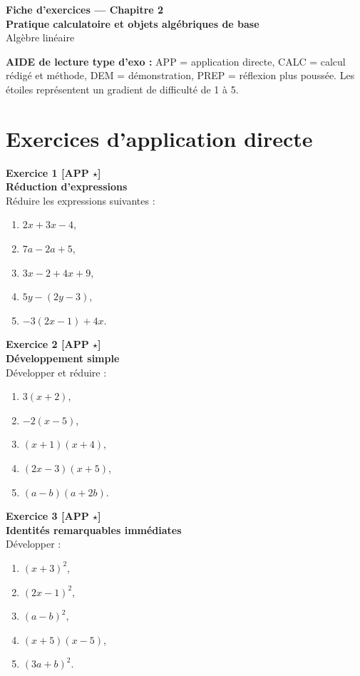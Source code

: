 \documentclass[11pt,a4paper]{article}
\begin{document}
\begin{center}
    {\LARGE \textbf{Fiche d’exercices --- Chapitre 2}}\\[0.4em]
    {\Large \textbf{Pratique calculatoire et objets algébriques de base}}\\[0.6em]
    Algèbre linéaire
\end{center}

\textbf{AIDE de lecture type d’exo :} APP = application directe, CALC = calcul rédigé et méthode, DEM = démonstration, PREP = réflexion plus poussée. Les étoiles représentent un gradient de difficulté de 1 à 5.

\tableofcontents

\newpage

\section*{Exercices d’application directe}

\textbf{Exercice 1 [APP $\star$]}\\
\textbf{Réduction d’expressions}\\
Réduire les expressions suivantes :
\begin{enumerate}[label=\alph*)]
    \item $2x+3x-4$,
    \item $7a-2a+5$,
    \item $3x-2+4x+9$,
    \item $5y-(2y-3)$,
    \item $-3(2x-1)+4x$.
\end{enumerate}

\textbf{Exercice 2 [APP $\star$]}\\
\textbf{Développement simple}\\
Développer et réduire :
\begin{enumerate}[label=\alph*)]
    \item $3(x+2)$,
    \item $-2(x-5)$,
    \item $(x+1)(x+4)$,
    \item $(2x-3)(x+5)$,
    \item $(a-b)(a+2b)$.
\end{enumerate}

\textbf{Exercice 3 [APP $\star$]}\\
\textbf{Identités remarquables immédiates}\\
Développer :
\begin{enumerate}[label=\alph*)]
    \item $(x+3)^2$,
    \item $(2x-1)^2$,
    \item $(a-b)^2$,
    \item $(x+5)(x-5)$,
    \item $(3a+b)^2$.
\end{enumerate}
\end{document}
